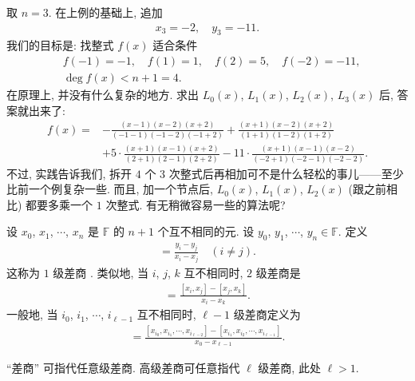 \begin{example}
    取 $n = 3$. 在上例的基础上, 追加
    \begin{align*}
        x_3 = -2, \quad y_3 = -11.
    \end{align*}
    我们的目标是: 找整式 $f(x)$ 适合条件
    \begin{align*}
         & f(-1) = -1, \quad f(1) = 1, \quad f(2) = 5, \quad f(-2) = -11, \\
         & \deg f(x) < n + 1 = 4.
    \end{align*}
    在原理上, 并没有什么复杂的地方. 求出 $L_0 (x)$, $L_1 (x)$, $L_2 (x)$, $L_3 (x)$ 后, 答案就出来了:
    \begin{align*}
        f(x)
        = {} & - \frac{(x-1)(x-2)(x+2)}{(-1-1)(-1-2)(-1+2)} + \frac{(x+1)(x-2)(x+2)}{(1+1)(1-2)(1+2)}                   \\
             & + 5 \cdot \frac{(x+1)(x-1)(x+2)}{(2+1)(2-1)(2+2)} - 11 \cdot \frac{(x+1)(x-1)(x-2)}{(-2+1)(-2-1)(-2-2)}.
    \end{align*}
    不过, 实践告诉我们, 拆开 $4$ 个 $3$ 次整式后再相加可不是什么轻松的事{\scriptsize 儿}——至少比前一个例复杂一些. 而且, 加一个节点后, $L_0 (x)$, $L_1 (x)$, $L_2 (x)$ (跟之前相比) 都要多乘一个 $1$ 次整式. 有无稍微容易一些的算法呢?
\end{example}

\begin{definition}
    设 $x_0$, $x_1$, $\cdots$, $x_{n}$ 是 $\mathbb{F}$ 的 $n+1$ 个互不相同的元. 设 $y_0$, $y_1$, $\cdots$, $y_{n} \in \mathbb{F}$. 定义
    \begin{align*}
        [x_i, x_j] = \frac{y_i - y_j}{x_i - x_j} \quad (i \neq j).
    \end{align*}
    这称为 $1$ 级差商 . 类似地, 当 $i$, $j$, $k$ 互不相同时, $2$ 级差商是
    \begin{align*}
        [x_i, x_j, x_k] = \frac{[x_i, x_j] - [x_j, x_k]}{x_i - x_k}.
    \end{align*}
    一般地, 当 $i_0$, $i_1$, $\cdots$, $i_{\ell - 1}$ 互不相同时, $\ell - 1$ 级差商定义为
    \begin{align*}
        [x_{i_0}, x_{i_1}, \cdots, x_{i_{\ell - 1}}] = \frac{[x_{i_0}, x_{i_1}, \cdots, x_{i_{\ell - 2}}] - [x_{i_1}, x_{i_2}, \cdots, x_{i_{\ell - 1}}]}{x_0 - x_{\ell - 1}}.
    \end{align*}

    ``差商'' 可指代任意级差商. 高级差商可任意指代 $\ell$ 级差商, 此处 $\ell > 1$.
\end{definition}

